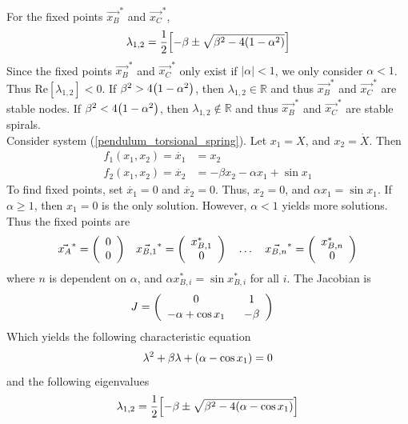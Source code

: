 \documentclass[12pt]{article}
\begin{document}
For the fixed points $\vec{x_B}^*$ and $\vec{x_C}^*$,
\begin{align*}
	\lambda_{1,2} = \frac{1}{2}\qty[-\beta \pm \sqrt{\beta^2 - 4\qty(1 - \alpha^2)}]
\end{align*}
Since the fixed points $\vec{x_B}^*$ and $\vec{x_C}^*$ only exist if $|\alpha| < 1$, we only consider $\alpha < 1$.  Thus $\text{Re}[\lambda_{1,2}] < 0$.  If $\beta^2 > 4\qty(1 - \alpha^2)$, then $\lambda_{1,2} \in \mathbb{R}$ and thus $\vec{x_B}^*$ and $\vec{x_C}^*$ are stable nodes.  If $\beta^2 < 4\qty(1 - \alpha^2)$, then $\lambda_{1,2} \not\in \mathbb{R}$ and thus $\vec{x_B}^*$ and $\vec{x_C}^*$ are stable spirals. \\

Consider system (\ref{pendulum_torsional_spring}).  Let $x_1 = X$, and $x_2 = \dot{X}$.  Then
\begin{align*}
	f_1(x_1, x_2) = \dot{x_1} &= x_2 \\[.05cm]
	f_2(x_1, x_2) = \dot{x_2} &= -\beta x_2 - \alpha x_1 + \sin x_1
\end{align*}
To find fixed points, set $\dot{x_1} = 0$ and $\dot{x_2} = 0$.  Thus, $x_2 = 0$, and $\alpha x_1 = \sin x_1$.  If $\alpha \geq 1$, then $x_1 = 0$ is the only solution.  However, $\alpha < 1$ yields more solutions.  Thus the fixed points are
\begin{align*}
	\vec{x_A}^* = \qty(\begin{array}{cc}0 \\ 0\end{array})\ \ \ \vec{x_{B,1}}^* = \qty(\begin{array}{cc}x_{B,1}^* \\ 0\end{array})\ \ \ \dots\ \ \ \vec{x_{B,n}}^* = \qty(\begin{array}{cc}x_{B,n}^* \\ 0\end{array})
\end{align*}
where $n$ is dependent on $\alpha$, and $\alpha x_{B,i}^* = \sin x_{B,i}^*$ for all $i$.  The Jacobian is
\begin{align*}
	J &= \qty(\begin{array}{cc}
		0\ &\ 1 \\[.05cm]
		-\alpha + \cos x_1\ &\ -\beta
	\end{array})
\end{align*}
Which yields the following characteristic equation
\begin{align*}
	\lambda^2 + \beta\lambda + \qty(\alpha - \cos x_1) = 0
\end{align*}
and the following eigenvalues
\begin{align*}
	\lambda_{1,2} = \frac{1}{2}\qty[-\beta \pm \sqrt{\beta^2 - 4\qty(\alpha - \cos x_1)}]
\end{align*}
\end{document}
